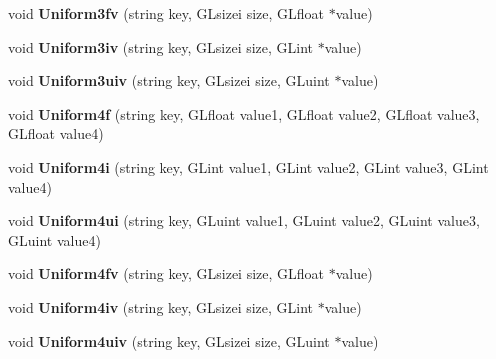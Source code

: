 \begin{DoxyCompactItemize}
\item 
\hypertarget{class_shader_program_a41b9386673f221fbaf26af820e123f63}{void {\bfseries Uniform3fv} (string key, G\-Lsizei size, G\-Lfloat $\ast$value)}\label{class_shader_program_a41b9386673f221fbaf26af820e123f63}

\item 
\hypertarget{class_shader_program_a6d17f9f8f5a335957872eacb66cf89ee}{void {\bfseries Uniform3iv} (string key, G\-Lsizei size, G\-Lint $\ast$value)}\label{class_shader_program_a6d17f9f8f5a335957872eacb66cf89ee}

\item 
\hypertarget{class_shader_program_a0af2d05e8ba93f2c3533fe072e264d31}{void {\bfseries Uniform3uiv} (string key, G\-Lsizei size, G\-Luint $\ast$value)}\label{class_shader_program_a0af2d05e8ba93f2c3533fe072e264d31}

\item 
\hypertarget{class_shader_program_af8c726567bf506259036c53bf254b1ce}{void {\bfseries Uniform4f} (string key, G\-Lfloat value1, G\-Lfloat value2, G\-Lfloat value3, G\-Lfloat value4)}\label{class_shader_program_af8c726567bf506259036c53bf254b1ce}

\item 
\hypertarget{class_shader_program_aaf10b61ae0d5dc7ef36458c1577549e1}{void {\bfseries Uniform4i} (string key, G\-Lint value1, G\-Lint value2, G\-Lint value3, G\-Lint value4)}\label{class_shader_program_aaf10b61ae0d5dc7ef36458c1577549e1}

\item 
\hypertarget{class_shader_program_a4ce6b7a66e0bba717150f34cd8c17695}{void {\bfseries Uniform4ui} (string key, G\-Luint value1, G\-Luint value2, G\-Luint value3, G\-Luint value4)}\label{class_shader_program_a4ce6b7a66e0bba717150f34cd8c17695}

\item 
\hypertarget{class_shader_program_aac8e9e7149afcf328299e89923c28765}{void {\bfseries Uniform4fv} (string key, G\-Lsizei size, G\-Lfloat $\ast$value)}\label{class_shader_program_aac8e9e7149afcf328299e89923c28765}

\item 
\hypertarget{class_shader_program_a6ac03cffa9742ca0db7955767a3b7732}{void {\bfseries Uniform4iv} (string key, G\-Lsizei size, G\-Lint $\ast$value)}\label{class_shader_program_a6ac03cffa9742ca0db7955767a3b7732}

\item 
\hypertarget{class_shader_program_ab0dd477da0792424017d5e56f420295e}{void {\bfseries Uniform4uiv} (string key, G\-Lsizei size, G\-Luint $\ast$value)}\label{class_shader_program_ab0dd477da0792424017d5e56f420295e}


\end{DoxyCompactItemize}
